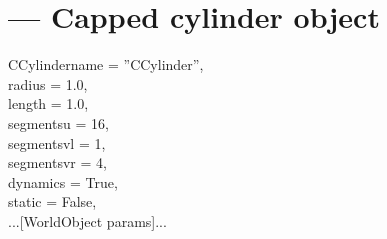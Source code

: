 
\section{ ---
         Capped cylinder object}

\begin{classdesc}{CCylinder}{name = ''CCylinder'',\\ 
                       radius = 1.0,\\
                       length = 1.0,\\
                       segmentsu = 16,\\
                       segmentsvl = 1,\\
                       segmentsvr = 4,\\
                       dynamics = True,\\
                       static = False,\\
                       ...[WorldObject params]...
                       }

\end{classdesc}


